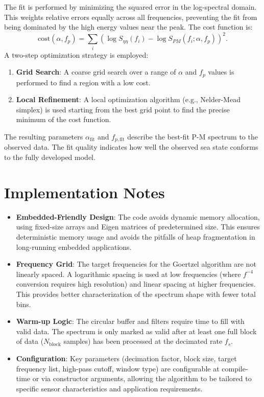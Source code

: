 \documentclass[11pt,letterpaper]{article}
\begin{document}
The fit is performed by minimizing the squared error in the log-spectral domain. This weights relative errors equally across all frequencies, preventing the fit from being dominated by the high energy values near the peak. The cost function is:
\begin{equation}
\text{cost}(\alpha, f_p) = \sum_{i} \left(\log S_{\eta\eta}(f_i) - \log S_{PM}(f_i;\alpha, f_p)\right)^2.
\end{equation}
A two-step optimization strategy is employed:
\begin{enumerate}
    \item \textbf{Grid Search}: A coarse grid search over a range of $\alpha$ and $f_p$ values is performed to find a region with a low cost.
    \item \textbf{Local Refinement}: A local optimization algorithm (e.g., Nelder-Mead simplex) is used starting from the best grid point to find the precise minimum of the cost function.
\end{enumerate}
The resulting parameters $\alpha_{\text{fit}}$ and $f_{p,\text{fit}}$ describe the best-fit P-M spectrum to the observed data. The fit quality indicates how well the observed sea state conforms to the fully developed model.

\section{Implementation Notes}
\label{sec:implementation}
\begin{itemize}
\item \textbf{Embedded-Friendly Design}: The code avoids dynamic memory allocation, using fixed-size arrays and Eigen matrices of predetermined size. This ensures deterministic memory usage and avoids the pitfalls of heap fragmentation in long-running embedded applications.
\item \textbf{Frequency Grid}: The target frequencies for the Goertzel algorithm are not linearly spaced. A logarithmic spacing is used at low frequencies (where $f^{-4}$ conversion requires high resolution) and linear spacing at higher frequencies. This provides better characterization of the spectrum shape with fewer total bins.
\item \textbf{Warm-up Logic}: The circular buffer and filters require time to fill with valid data. The spectrum is only marked as valid after at least one full block of data ($N_\text{block}$ samples) has been processed at the decimated rate $f_s$.
\item \textbf{Configuration}: Key parameters (decimation factor, block size, target frequency list, high-pass cutoff, window type) are configurable at compile-time or via constructor arguments, allowing the algorithm to be tailored to specific sensor characteristics and application requirements.
\end{itemize}
\end{document}

